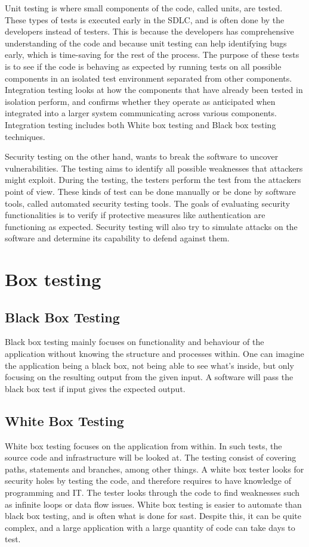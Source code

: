 Unit testing is where small components of the code, called units, are tested. These types of tests is executed early in the SDLC, and is often done by the developers instead of testers. This is because the developers has comprehensive understanding of the code and because unit testing can help identifying bugs early, which is time-saving for the rest of the process. The purpose of these tests is to see if the code is behaving as expected by running tests on all possible components in an isolated test environment separated from other components. Integration testing looks at how the components that have already been tested in isolation perform, and confirms whether they operate as anticipated when integrated into a larger system communicating across various components. Integration testing includes both White box testing and Black box testing techniques.  \cite{unitvsintergration}

Security testing on the other hand, wants to break the software to uncover vulnerabilities. The testing aims to identify all possible weaknesses that attackers might exploit. During the testing, the testers perform the test from the attackers point of view. These kinds of test can be done manually or be done by software tools, called automated security testing tools. The goals of evaluating security functionalities is to verify if protective measures like authentication are functioning as expected. Security testing will also try to simulate attacks on the software and determine its capability to defend against them.\cite{whysectest}


\section{Box testing}
\label{boxtesting}
\subsection{Black Box Testing}
Black box testing mainly focuses on functionality and behaviour of the application without knowing the structure and processes within. One can imagine the application being a black box, not being able to see what's inside, but only focusing on the resulting output from the given input. A software will pass the black box test if input gives the expected output. \cite{blackbox}

\subsection{White Box Testing}
White box testing focuses on the application from within. In such tests, the source code and infrastructure will be looked at. The testing consist of covering paths, statements and branches, among other things. A white box tester looks for security holes by testing the code, and therefore requires to have knowledge of programming and IT. The tester looks through the code to find weaknesses such as infinite loops or data flow issues. White box testing is easier to automate than black box testing, and is often what is done for \acrlong{sast}. Despite this, it can be quite complex, and a large application with a large quantity of code can take days to test. \cite{whitebox}
\newpage

